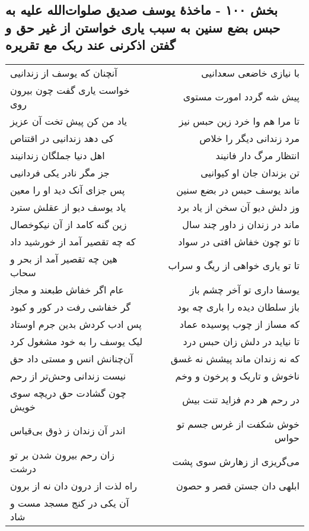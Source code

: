 \begin{center}
\section*{بخش ۱۰۰ - ماخذهٔ یوسف صدیق صلوات‌الله علیه به حبس بضع سنین به سبب یاری خواستن از غیر حق و گفتن اذکرنی عند ربک مع  تقریره}
\label{sec:sh100}
\begin{longtable}{l p{0.5cm} r}
آنچنان که یوسف از زندانیی
&&
با نیازی خاضعی سعدانیی
\\
خواست یاری گفت چون بیرون روی
&&
پیش شه گردد امورت مستوی
\\
یاد من کن پیش تخت آن عزیز
&&
تا مرا هم وا خرد زین حبس نیز
\\
کی دهد زندانیی در اقتناص
&&
مرد زندانی دیگر را خلاص
\\
اهل دنیا جملگان زندانیند
&&
انتظار مرگ دار فانیند
\\
جز مگر نادر یکی فردانیی
&&
تن بزندان جان او کیوانیی
\\
پس جزای آنک دید او را معین
&&
ماند یوسف حبس در بضع سنین
\\
یاد یوسف دیو از عقلش سترد
&&
وز دلش دیو آن سخن از یاد برد
\\
زین گنه کامد از آن نیکوخصال
&&
ماند در زندان ز داور چند سال
\\
که چه تقصیر آمد از خورشید داد
&&
تا تو چون خفاش افتی در سواد
\\
هین چه تقصیر آمد از بحر و سحاب
&&
تا تو یاری خواهی از ریگ و سراب
\\
عام اگر خفاش طبعند و مجاز
&&
یوسفا داری تو آخر چشم باز
\\
گر خفاشی رفت در کور و کبود
&&
باز سلطان دیده را باری چه بود
\\
پس ادب کردش بدین جرم اوستاد
&&
که مساز از چوب پوسیده عماد
\\
لیک یوسف را به خود مشغول کرد
&&
تا نیاید در دلش زان حبس درد
\\
آن‌چنانش انس و مستی داد حق
&&
که نه زندان ماند پیشش نه غسق
\\
نیست زندانی وحش‌تر از رحم
&&
ناخوش و تاریک و پرخون و وخم
\\
چون گشادت حق دریچه سوی خویش
&&
در رحم هر دم فزاید تنت بیش
\\
اندر آن زندان ز ذوق بی‌قیاس
&&
خوش شکفت از غرس جسم تو حواس
\\
زان رحم بیرون شدن بر تو درشت
&&
می‌گریزی از زهارش سوی پشت
\\
راه لذت از درون دان نه از برون
&&
ابلهی دان جستن قصر و حصون
\\
آن یکی در کنج مسجد مست و شاد

\end{longtable}
\end{center}

